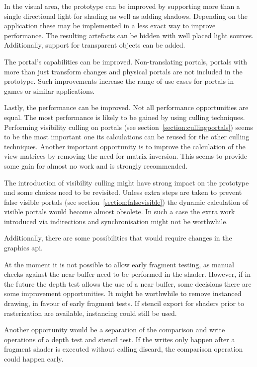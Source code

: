 In the visual area, the prototype can be improved by supporting more than a single directional light for shading as well as adding shadows. Depending on the application these may be implemented in a less exact way to improve performance. The resulting artefacts can be hidden with well placed light sources. Additionally, support for transparent objects can be added.

The portal's capabilities can be improved. Non-translating portals, portals with more than just transform changes and physical portals are not included in the prototype. Such improvements increase the range of use cases for portals in games or similar applications.

Lastly, the performance can be improved. Not all performance opportunities are equal. The most performance is likely to be gained by using culling techniques. Performing visibility culling on portals (see section~\ref{section:cullingportals}) seems to be the most important one its calculations can be reused for the other culling techniques. Another important opportunity is to improve the calculation of the view matrices by removing the need for matrix inversion. This seems to provide some gain for almost no work and is strongly recommended.

The introduction of visibility culling might have strong impact on the prototype and some choices need to be revisited. Unless extra steps are taken to prevent false visible portals (see section~\ref{section:falsevisible}) the dynamic calculation of visible portals would become almost obsolete. In such a case the extra work introduced via indirections and synchronisation might not be worthwhile.

Additionally, there are some possibilities that would require changes in the graphics \gls{api}.

At the moment it is not possible to allow early fragment testing, as manual checks against the near buffer need to be performed in the shader. However, if in the future the depth test allows the use of a near buffer, some decisions there are some improvement opportunities. It might be worthwhile to remove instanced drawing, in favour of early fragment tests. If stencil export for shaders prior to rasterization are available, instancing could still be used.

Another opportunity would be a separation of the comparison and write operations of a depth test and stencil test. If the writes only happen after a fragment shader is executed without calling discard, the comparison operation could happen early.


